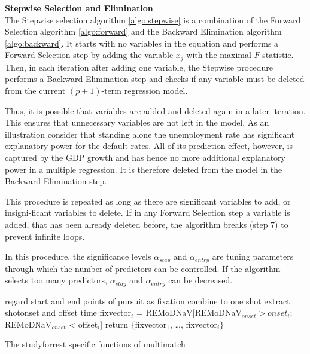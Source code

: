 \documentclass[a4paper, 11pt]{scrreprt}
\begin{document}
\bigskip 
\textbf{Stepwise Selection and Elimination} \\
The Stepwise selection algorithm \ref{algo:stepwise} is a combination of the Forward Selection algorithm \ref{algo:forward} and the Backward Elimination algorithm \ref{algo:backward}.
It starts with no variables in the equation and performs a Forward Selection step by adding the variable $x_j$ with the maximal $F$-statistic. Then, in each iteration after adding one variable, the Stepwise procedure performs a Backward Elimination step and checks if any variable must be deleted from the current $(p+1)$-term regression model.

Thus, it is possible that variables are added and deleted again in a later iteration. This ensures that unnecessary variables are not left in the model. As an illustration consider that standing alone the unemployment rate has significant explanatory power for the default rates. All of its prediction effect, however, is captured by the GDP growth and has hence no more additional explanatory power in a multiple regression. It is therefore deleted from the model in the Backward Elimination step.

This procedure is repeated as long as there are significant variables to add, or insigni-ficant variables to delete. If in any Forward Selection step a variable is added, that has been already deleted before, the algorithm breaks (step 7) to prevent infinite loops.

In this procedure, the significance levels $\alpha_{stay}$ and $\alpha_{entry}$ are tuning parameters through which the number of predictors can be controlled.
If the algorithm selects too many predictors, $\alpha_{stay}$ and $\alpha_{entry}$ can be decreased.

\begin{algorithm}
	
	{
		{
			regard start and end points of pursuit as fixation
		}
	}
	{
	}
	{
		{combine to one shot}
	}
{
	{extract shotonset and offset time}
}
	{fixvector$_i$ = REMoDNaV[REMoDNaV$_{onset} > onset_i$; REMoDNaV$_{onset}$ < offset$_i$]
}
	return $\{$fixvector$_1$, \ldots, fixvector$_i$$\}$
	\caption{The studyforrest specific functions of multimatch}
	\label{algo:multimatch_forrest}
\end{algorithm}
\end{document}
